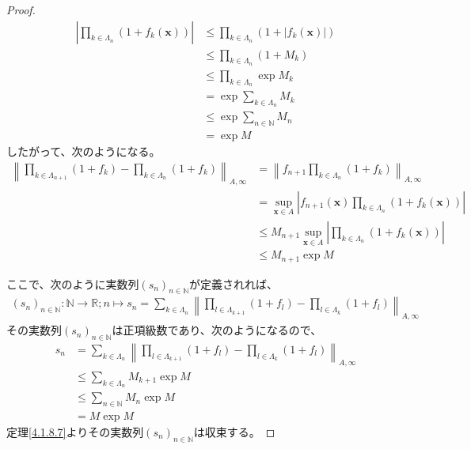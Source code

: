 \documentclass[dvipdfmx]{jsarticle}
\begin{document}
\begin{proof}
\begin{align*}
\left| \prod_{k \in \varLambda_{n}} \left( 1 + f_{k}\left( \mathbf{x} \right) \right) \right| &\leq \prod_{k \in \varLambda_{n}} \left( 1 + \left| f_{k}\left( \mathbf{x} \right) \right| \right)\\
&\leq \prod_{k \in \varLambda_{n}} \left( 1 + M_{k} \right)\\
&\leq \prod_{k \in \varLambda_{n}} {\exp M_{k}}\\
&= \exp{\sum_{k \in \varLambda_{n}} M_{k}}\\
&\leq \exp{\sum_{n \in \mathbb{N}} M_{n}}\\
&= \exp M
\end{align*}
したがって、次のようになる。
\begin{align*}
\left\| \prod_{k \in \varLambda_{n + 1}} \left( 1 + f_{k} \right) - \prod_{k \in \varLambda_{n}} \left( 1 + f_{k} \right) \right\|_{A,\infty} &= \left\| f_{n + 1}\prod_{k \in \varLambda_{n}} \left( 1 + f_{k} \right) \right\|_{A,\infty}\\
&= \sup_{\mathbf{x} \in A}\left| f_{n + 1}\left( \mathbf{x} \right)\prod_{k \in \varLambda_{n}} \left( 1 + f_{k}\left( \mathbf{x} \right) \right) \right|\\
&\leq M_{n + 1}\sup_{\mathbf{x} \in A}\left| \prod_{k \in \varLambda_{n}} \left( 1 + f_{k}\left( \mathbf{x} \right) \right) \right|\\
&\leq M_{n + 1}\exp M
\end{align*}\par
ここで、次のように実数列$\left( s_{n} \right)_{n \in \mathbb{N}}$が定義されれば、
\begin{align*}
\left( s_{n} \right)_{n \in \mathbb{N}}:\mathbb{N} \rightarrow \mathbb{R};n \mapsto s_{n} = \sum_{k \in \varLambda_{n}} \left\| \prod_{l \in \varLambda_{k + 1}} \left( 1 + f_{l} \right) - \prod_{l \in \varLambda_{k}} \left( 1 + f_{l} \right) \right\|_{A,\infty}
\end{align*}
その実数列$\left( s_{n} \right)_{n \in \mathbb{N}}$は正項級数であり、次のようになるので、
\begin{align*}
s_{n} &= \sum_{k \in \varLambda_{n}} \left\| \prod_{l \in \varLambda_{k + 1}} \left( 1 + f_{l} \right) - \prod_{l \in \varLambda_{k}} \left( 1 + f_{l} \right) \right\|_{A,\infty}\\
&\leq \sum_{k \in \varLambda_{n}} {M_{k + 1}\exp M}\\
&\leq \sum_{n \in \mathbb{N}} M_{n}\exp M\\
&= M\exp M
\end{align*}
定理\ref{4.1.8.7}よりその実数列$\left( s_{n} \right)_{n \in \mathbb{N}}$は収束する。\par

\end{proof}
\end{document}
